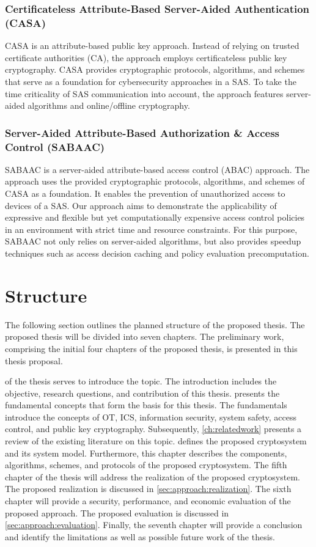 \subsubsection*{Certificateless Attribute-Based Server-Aided Authentication (CASA)}
CASA is an attribute-based public key approach.
Instead of relying on trusted certificate authorities (CA), the approach employs certificateless public key cryptography.
CASA provides cryptographic protocols, algorithms, and schemes that serve as a foundation for cybersecurity approaches in a SAS.
To take the time criticality of SAS communication into account, the approach features server-aided algorithms and online/offline cryptography.

\subsubsection*{Server-Aided Attribute-Based Authorization \& Access Control (SABAAC)}
SABAAC is a server-aided attribute-based access control (ABAC) approach.
The approach uses the provided cryptographic protocols, algorithms, and schemes of CASA as a foundation.
It enables the prevention of unauthorized access to devices of a SAS.
Our approach aims to demonstrate the applicability of expressive and flexible but yet computationally expensive access control policies in an environment with strict time and resource constraints.
For this purpose, SABAAC not only relies on server-aided algorithms, but also provides speedup techniques such as access decision caching and policy evaluation precomputation.

\section{Structure}
\label{sec:introduction:structure}
The following section outlines the planned structure of the proposed thesis.
The proposed thesis will be divided into seven chapters.
The preliminary work, comprising the initial four chapters of the proposed thesis, is presented in this thesis proposal.

 of the thesis serves to introduce the topic.
The introduction includes the objective, research questions, and contribution of this thesis.
 presents the fundamental concepts that form the basis for this thesis.
The fundamentals introduce the concepts of OT, ICS, information security, system safety, access control, and public key cryptography.
Subsequently, \cref{ch:relatedwork} presents a review of the existing literature on this topic.
 defines the proposed cryptosystem and its system model.
Furthermore, this chapter describes the components, algorithms, schemes, and protocols of the proposed cryptosystem.
The fifth chapter of the thesis will address the realization of the proposed cryptosystem.
The proposed realization is discussed in \cref{sec:approach:realization}.
The sixth chapter will provide a security, performance, and economic evaluation of the proposed approach.
The proposed evaluation is discussed in \cref{sec:approach:evaluation}.
Finally, the seventh chapter will provide a conclusion and identify the limitations as well as possible future work of the thesis.

